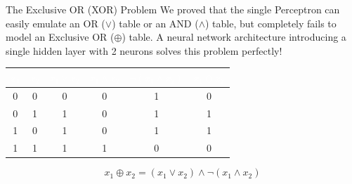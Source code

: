 \begin{frame}{The Exclusive OR (XOR) Problem}
	We proved that the single Perceptron can easily emulate an OR ($\lor$) table or an AND ($\land$) table, but completely fails to model an Exclusive OR ($\oplus$) table. A neural network architecture introducing a single hidden layer with 2 neurons solves this problem perfectly!
	
	\begin{table}
		\centering
		\renewcommand{\arraystretch}{1.3} 
		\begin{tabular}{|c|c|c|c|c|c|}
			\hline
			\rowcolor{blue!80!black} 
			\textcolor{white}{\textbf{$x_1$}} & 
			\textcolor{white}{\textbf{$x_2$}} & 
			\textcolor{white}{\textbf{$x_1 \lor x_2$}} & 
			\textcolor{white}{\textbf{$x_1 \land x_2$}} & 
			\textcolor{white}{\textbf{$\neg (x_1 \land x_2)$}} & 
			\textcolor{white}{\textbf{$x_1 \oplus x_2$}} \\
			\hline
			0 & 0 & 0 & 0 & 1 & 0 \\
			\hline
			0 & 1 & 1 & 0 & 1 & 1 \\
			\hline
			1 & 0 & 1 & 0 & 1 & 1 \\
			\hline
			1 & 1 & 1 & 1 & 0 & 0 \\
			\hline
		\end{tabular}
	\end{table}
	
	\begin{equation*}
		x_1 \oplus x_2 = (x_1 \lor x_2) \land \neg (x_1 \land x_2)
	\end{equation*}
	
\end{frame}

